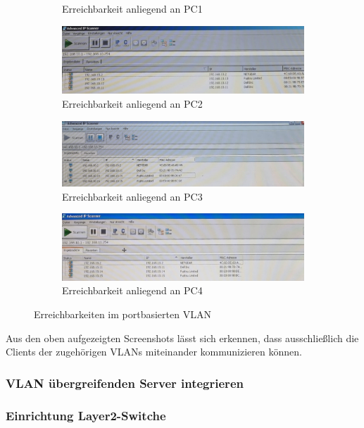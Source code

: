 \begin{figure}[H]
\begin{subfigure}{.45\linewidth}
                \caption{Erreichbarkeit anliegend an PC1}
            \end{subfigure}
            \begin{subfigure}{\textwidth}
                \centering
                \includegraphics[width=\linewidth]{images/Trennung durch VLAN herstellen/ErreichbarkeitAnliegendAn13.jpg}
                \caption{Erreichbarkeit anliegend an PC2}
            \end{subfigure}
            \begin{subfigure}{\textwidth}
                \centering
                \includegraphics[width=\linewidth]{images/Trennung durch VLAN herstellen/ErreichbarkeitAnliegendAn14.jpg}
                \caption{Erreichbarkeit anliegend an PC3}
            \end{subfigure}
            \begin{subfigure}{\textwidth}
                \centering
                \includegraphics[width=\linewidth]{images/Trennung durch VLAN herstellen/ErreichbarkeitAnliegendAn15.jpg}
                \caption{Erreichbarkeit anliegend an PC4}
            \end{subfigure}
        \caption{Erreichbarkeiten im portbasierten VLAN}
        \end{figure}
        Aus den oben aufgezeigten Screenshots lässt sich erkennen, dass ausschließlich die Clients der 
        zugehörigen VLANs miteinander kommunizieren können.


        \newpage
        \subsubsection{VLAN übergreifenden Server integrieren}

        \newpage
        \subsubsection{Einrichtung Layer2-Switche}